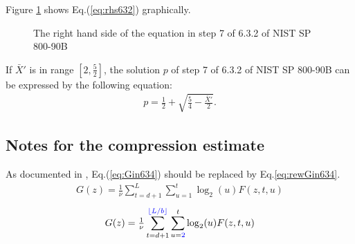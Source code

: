 ﻿\documentclass[a3paper,xelatex,english]{bxjsarticle}
\begin{document}
Figure \ref{fig:rhs632} shows Eq.(\ref{eq:rhs632}) graphically.
\begin{figure}[htbp]
\centering


\caption{The right hand side of the equation in step 7 of 6.3.2 of NIST SP 800-90B}\label{fig:rhs632}

\end{figure}

If $\bar{X}'$ is in range $[2, \tfrac{5}{2}]$, the solution $p$ of step 7 of 6.3.2 of NIST SP 800-90B\cite{SP80090B} can be expressed by the following equation:
\begin{align}
p = \frac{1}{2} + \sqrt{\frac{5}{4} - \frac{\bar{X}'}{2}}.
\end{align}

\clearpage
\subsection{Notes for the compression estimate}\label{sect:notes_compression}

As documented in \cite{CorrectionsSP80090B}, Eq.(\ref{eq:Gin634}) should be replaced by Eq.\ref{eq:rewGin634}.
\begin{align}
G(z) = \tfrac{1}{\nu} 
\sum_{t = d + 1}^{L} 
\sum_{u = 1}^{t} 
\log_{2}(u) F(z, t, u)  \label{eq:Gin634}
\end{align}
\begin{align}
G(z) = \tfrac{1}{\nu} 
\sum_{t = d + 1}^{\textcolor{blue}{\lfloor L / b \rfloor}} 
\sum_{u = \textcolor{blue}{2}}^{t} 
\log_{2}(u) F(z, t, u)  \label{eq:rewGin634}
\end{align}
\end{document}
